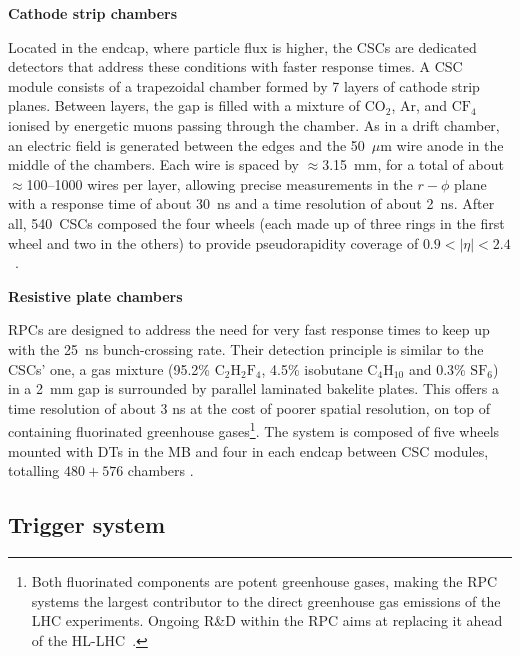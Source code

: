 \vspace{0.5 cm}

\noindent \textbf{Cathode strip chambers}

\vspace{0.5 cm}

Located in the endcap, where particle flux is higher, the CSCs are dedicated detectors that address these conditions with faster response times. A CSC module consists of a trapezoidal chamber formed by 7 layers of cathode strip planes. Between layers, the gap is filled with a mixture of $\textrm{CO}_2$, Ar, and $\textrm{CF}_4$ ionised by energetic muons passing through the chamber. As in a drift chamber, an electric field is generated between the edges and the 50~$\mu$m wire anode in the middle of the chambers. Each wire is spaced by $\approx$3.15~mm, for a total of about $\approx$100--1000 wires per layer, allowing precise measurements in the $r{-}\phi$ plane with a response time of about 30~ns and a time resolution of about 2~ns. After all, 540~CSCs composed the four wheels (each made up of three rings in the first wheel and two in the others) to provide pseudorapidity coverage of $0.9<|\eta|<2.4$~\cite{CSCs}.

\vspace{0.5 cm}
\noindent \textbf{Resistive plate chambers}
\vspace{0.5 cm}

RPCs are designed to address the need for very fast response times to keep up with the 25~ns bunch-crossing rate. Their detection principle is similar to the CSCs' one, a gas mixture (95.2\% $\textrm{C}_2\textrm{H}_2\textrm{F}_4$, 4.5\% isobutane $\textrm{C}_4\textrm{H}_{10}$ and 0.3\% $\textrm{SF}_6$) in a 2~mm gap is surrounded by parallel laminated bakelite plates. This offers a time resolution of about 3 ns at the cost of poorer spatial resolution, on top of containing fluorinated greenhouse gases\footnote{Both fluorinated components are potent greenhouse gases, making the RPC systems the largest contributor to the direct greenhouse gas emissions of the LHC experiments. Ongoing R\&D within the RPC aims at replacing it ahead of the HL-LHC~\cite{RPCecolo}.}. The system is composed of five wheels mounted with DTs in the MB and four in each endcap between CSC modules, totalling $480+576$ chambers \cite{RPCs}.


\subsection{Trigger system}

